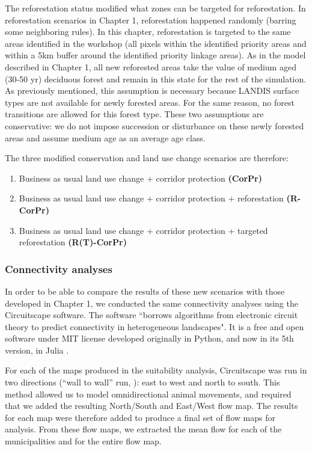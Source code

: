 The reforestation status modified what zones can be targeted for reforestation. In reforestation scenarios in Chapter 1, reforestation happened randomly (barring some neighboring rules). In this chapter, reforestation is targeted to the same areas identified in the workshop (all pixels within the identified priority areas and within a 5km buffer around the identified priority linkage areas). As in the model described in Chapter 1, all new reforested areas take the value of medium aged (30-50 yr) deciduous forest and remain in this state for the rest of the simulation. As previously mentioned, this assumption is necessary because LANDIS surface types are not available for newly forested areas. For the same reason, no forest transitions are allowed for this forest type. These two assumptions are conservative:  we do not impose succession or disturbance on these newly forested areas and assume medium age as an average age class.

The three modified conservation and land use change scenarios are therefore:
\begin{enumerate}
  \item Business as usual land use change + corridor protection \textbf{(CorPr)}
 \item Business as usual land use change + corridor protection + reforestation \textbf{(R-CorPr)}
 \item Business as usual land use change + corridor protection + targeted reforestation \textbf{(R(T)-CorPr)} \\
\end{enumerate}

\subsubsection{Connectivity analyses}

In order to be able to compare the results of these new scenarios with those developed in Chapter 1, we conducted the same connectivity analyses using the Circuitscape software. The software “borrows algorithms from electronic circuit theory to predict connectivity in heterogeneous landscapes". It is a free and open software under MIT license developed originally in Python, and now in its 5th version, in Julia \citep{circuitjulia}.

For each of the maps produced in the suitability analysis, Circuitscape was run in two directions (“wall to wall” run, \cite{mcrae_conserving_2016}): east to west and north to south. This method allowed us to model omnidirectional animal movements, and required that we added the resulting North/South and East/West flow map. The results for each map were therefore added to produce a final set of flow maps for analysis. From these flow maps, we extracted the mean flow for each of the municipalities and for the entire flow map. 

